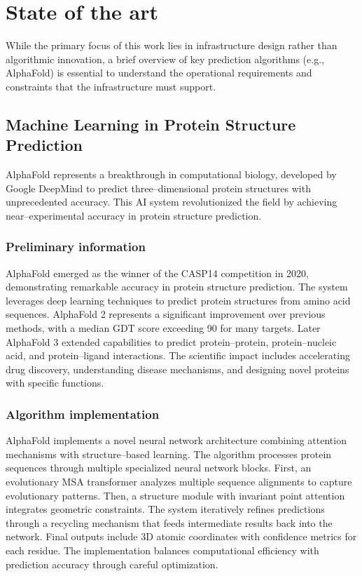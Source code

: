 

\chapter{State of the art}

While the primary focus of this work lies in infrastructure design rather than algorithmic innovation, a brief overview of key prediction algorithms (e.g., AlphaFold) is essential to understand the operational requirements and constraints that the infrastructure must support.


\section{Machine Learning in Protein Structure Prediction}

AlphaFold represents a breakthrough in computational biology, developed by Google DeepMind to predict three--dimensional protein structures with unprecedented accuracy.
This AI system revolutionized the field by achieving near--experimental accuracy in protein structure prediction.

\subsection{Preliminary information}

AlphaFold emerged as the winner of the CASP14 competition in 2020, demonstrating remarkable accuracy in protein structure prediction.
The system leverages deep learning techniques to predict protein structures from amino acid sequences.
AlphaFold 2 represents a significant improvement over previous methods, with a median GDT score exceeding 90 for many targets.
Later AlphaFold 3 extended capabilities to predict protein--protein, protein--nucleic acid, and protein--ligand interactions.
The scientific impact includes accelerating drug discovery, understanding disease mechanisms, and designing novel proteins with specific functions.

\subsection{Algorithm implementation}

AlphaFold implements a novel neural network architecture combining attention mechanisms with structure--based learning.
The algorithm processes protein sequences through multiple specialized neural network blocks.
First, an evolutionary MSA transformer analyzes multiple sequence alignments to capture evolutionary patterns.
Then, a structure module with invariant point attention integrates geometric constraints.
The system iteratively refines predictions through a recycling mechanism that feeds intermediate results back into the network.
Final outputs include 3D atomic coordinates with confidence metrics for each residue.
The implementation balances computational efficiency with prediction accuracy through careful optimization.


